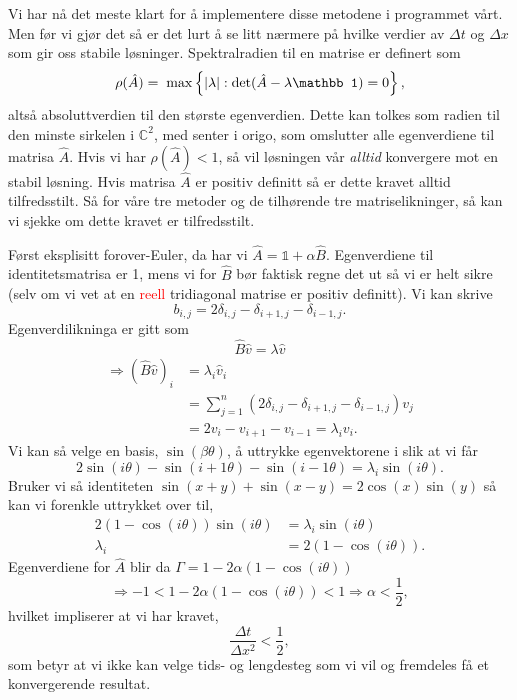 \documentclass[norsk, 10pt]{article}
\newcommand{\red}[1]{\textcolor{red}{#1}}
\begin{document}
Vi har nå det meste klart for å implementere disse metodene i programmet vårt. Men før vi gjør det så er det lurt å se litt nærmere på hvilke verdier av  $\Delta t$ og $\Delta x$ som gir oss stabile løsninger. Spektralradien til en matrise er definert som
$$ \rho(\hat{A}) = \hspace{0.1cm}\mathrm{max}\left\{|\lambda|:\mathrm{det}(\hat A-\lambda\mathbb 1)=0\right\}, $$
altså absoluttverdien til den største egenverdien. Dette kan tolkes som radien til den minste sirkelen i $\mathbb C^2$, med senter i origo, som omslutter alle egenverdiene til matrisa $\hat A$. Hvis vi har $\rho(\hat{A}) < 1$, så vil løsningen vår \emph{alltid} konvergere mot en stabil løsning. Hvis matrisa $\hat A $ er positiv definitt så er dette kravet alltid tilfredsstilt. Så for våre tre metoder og de tilhørende tre matriselikninger, så kan vi sjekke om dette kravet er tilfredsstilt.

Først eksplisitt forover-Euler, da har vi $\hat A = \mathbb 1 + \alpha \hat B$. Egenverdiene til identitetsmatrisa er 1, mens vi for $\hat B$ bør faktisk regne det ut så vi er helt sikre (selv om vi vet at en \red{reell} tridiagonal matrise er positiv definitt). Vi kan skrive
$$ b_{i,j} = 2\delta_{i,j} - \delta_{i+1,j} - \delta_{i-1,j}. $$
Egenverdilikninga er gitt som
$$ \hat B \hat v = \lambda \hat v $$
\begin{align*}
	\Rightarrow (\hat B \hat v)_i &= \lambda_i \hat v_i \\
	&= \sum\limits_{j=1}^{n}(2\delta_{i,j} - \delta_{i+1,j} - \delta_{i-1,j})v_j \\
	&= 2v_{i} - v_{i+1} - v_{i-1} = \lambda_i v_i.
\end{align*}
Vi kan så velge en basis, $\sin(\beta\theta)$, å uttrykke egenvektorene i slik at vi får
$$ 2\sin(i\theta) - \sin(i+1\theta) - \sin(i-1\theta) = \lambda_i \sin(i\theta). $$
Bruker vi så identiteten $\sin(x+y) + \sin(x-y) = 2\cos(x)\sin(y)$ så kan vi forenkle uttrykket over til,
\begin{align*}
2(1 - \cos(i\theta) )\sin(i\theta) &= \lambda_i \sin(i\theta) \\
\lambda_i &= 2(1 - \cos(i\theta) ).
\end{align*}
Egenverdiene for $\hat A$ blir da $\Gamma = 1-2\alpha(1 - \cos(i\theta) )$
$$ \Rightarrow -1 < 1-2\alpha(1 - \cos(i\theta) ) < 1 \Rightarrow \alpha < \frac{1}{2}, $$
hvilket impliserer at vi har kravet,
$$ \frac{\Delta t}{\Delta x^2} < \frac{1}{2}, $$
som betyr at vi ikke kan velge tids- og lengdesteg som vi vil og fremdeles få et konvergerende resultat.
\end{document}
